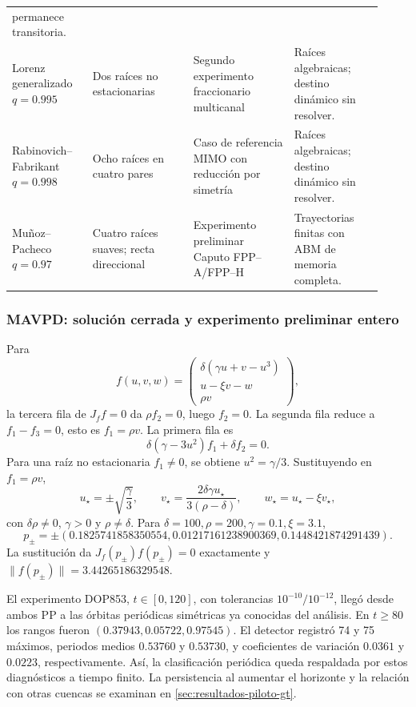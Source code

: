 \begin{longtable}{@{}L{0.20\linewidth}L{0.25\linewidth}L{0.25\linewidth}L{0.22\linewidth}@{}}
permanece transitoria.\\
Lorenz generalizado \(q=0.995\) & Dos raíces no estacionarias & Segundo experimento
fraccionario multicanal & Raíces algebraicas; destino dinámico sin resolver.\\
Rabinovich--Fabrikant \(q=0.998\) & Ocho raíces en cuatro pares & Caso de referencia MIMO
con reducción por simetría & Raíces algebraicas; destino dinámico sin resolver.\\
Muñoz--Pacheco \(q=0.97\) & Cuatro raíces suaves; recta direccional & Experimento preliminar Caputo
FPP--A/FPP--H & Trayectorias finitas con ABM de memoria completa.\\
\bottomrule
\end{longtable}

\subsubsection{MAVPD: solución cerrada y experimento preliminar entero}

Para
\begin{equation}
 f(u,v,w)=
 \begin{pmatrix}
 \delta(\gamma u+v-u^3)\\u-\xi v-w\\\rho v
 \end{pmatrix},
 \label{eq:pp-mavpd-field}
\end{equation}
la tercera fila de \(J_f f=0\) da \(\rho f_2=0\), luego \(f_2=0\). La segunda
fila reduce a \(f_1-f_3=0\), esto es \(f_1=\rho v\). La primera fila es
\begin{equation}
 \delta(\gamma-3u^2)f_1+\delta f_2=0.
\end{equation}
Para una raíz no estacionaria \(f_1\neq0\), se obtiene
\(u^2=\gamma/3\). Sustituyendo en \(f_1=\rho v\),
\begin{equation}
 u_\star=\pm\sqrt{\frac\gamma3},\qquad
 v_\star=\frac{2\delta\gamma u_\star}{3(\rho-\delta)},
 \qquad w_\star=u_\star-\xi v_\star,
 \label{eq:pp-mavpd-closed}
\end{equation}
con \(\delta\rho\ne0\), \(\gamma>0\) y \(\rho\neq\delta\). Para
\(\delta=100,\rho=200,\gamma=0.1,\xi=3.1\),
\begin{equation}
 p_\pm=\pm(0.1825741858350554,
 0.01217161238900369,0.1448421874291439).
\end{equation}
La sustitución da \(J_f(p_\pm)f(p_\pm)=0\) exactamente y
\(\|f(p_\pm)\|=3.44265186329548\).

El experimento DOP853, \(t\in[0,120]\), con tolerancias
\(10^{-10}/10^{-12}\), llegó desde ambos PP a las órbitas periódicas
simétricas ya conocidas del análisis. En \(t\ge80\) los rangos fueron
\((0.37943,0.05722,0.97545)\). El detector registró 74 y 75 máximos, periodos
medios \(0.53760\) y \(0.53730\), y coeficientes de variación \(0.0361\) y
\(0.0223\), respectivamente. Así, la clasificación periódica queda
respaldada por estos diagnósticos a tiempo finito. La persistencia al aumentar
el horizonte y la relación con otras cuencas se examinan en
\cref{sec:resultados-piloto-gt}.

